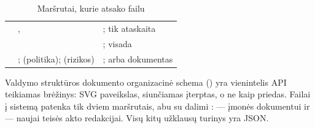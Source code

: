 \begin{table}[H]
\caption{Maršrutai, kurie atsako failu}\label{tab:api:exports}
\begin{tabularx}{\textwidth}{@{}L{47mm}L{24mm}Y@{}}
\toprule
{} &  &  \\
\midrule
{} & ,  & ; tik  ataskaita \\
 &  & ; visada \\
 & ;  (politika);  (rizikos) & ;  arba  dokumentas \\
\bottomrule
\end{tabularx}
\end{table}

Valdymo struktūros dokumento organizacinė schema () yra
vienintelis API teikiamas brėžinys: SVG paveikslas, siunčiamas įterptas, o ne kaip priedas. Failai
į sistemą patenka tik dviem maršrutais, abu  su dalimi :
 --- įmonės dokumentui ir
 --- naujai teisės akto redakcijai. Visų kitų
užklausų turinys yra JSON.
